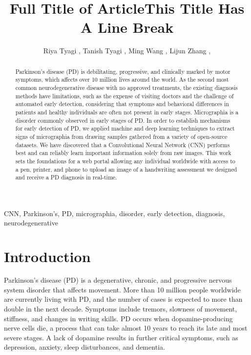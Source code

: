 \documentclass[pmlr,twocolumn,10pt]{jmlr} %
\title[Short Title]{Full Title of Article\titlebreak This Title Has
A Line Break}
\author{Riya Tyagi \nametag{\thanks{Authors contributed equally}\SUP{1}},
Tanish Tyagi \nametag{\footnotemark[1]\SUP{2}}, 
Ming Wang \SUP{3},
Lijun Zhang \SUP{4},
\centering \Email{
\\[\bigskipamount] 
\SUP{1}\{rtyagi\}
@exeter.edu}
\centering \Email{
\\[\bigskipamount] 
\SUP{2}\{ttyagi\}@mgh.harvard.edu}
\centering \Email{
\\[\bigskipamount] 
\SUP{3}\{mwang\}@phs.psu.edu}
\centering \Email{
\\[\bigskipamount] 
\SUP{4}\{lzhang6\}@pennstatehealth.psu.edu}
}
\begin{document}
\maketitle

\begin{abstract}
Parkinson’s disease (PD) is debilitating, progressive, and clinically marked by motor symptoms, which affects over 10 million lives around the world. As the second most common neurodegenerative disease with no approved treatments, the existing diagnosis methods have limitations, such as the expense of visiting doctors and the challenge of automated early detection, considering that symptoms and behavioral differences in patients and healthy individuals are often not present in early stages. Micrographia is a disorder commonly observed in early stages of PD. In order to establish mechanisms for early detection of PD, we applied machine and deep learning techniques to extract signs of micrographia from drawing samples gathered from a variety of open-source datasets. We have discovered that a Convolutional Neural Network (CNN) performs best and can reliably learn important information solely from raw images. This work sets the foundations for a web portal allowing any individual worldwide with access to a pen, printer, and phone to upload an image of a handwriting assessment we designed and receive a PD diagnosis in real-time.
\end{abstract}
\begin{keywords}
CNN, Parkinson’s, PD, micrographia, disorder, early detection, diagnosis, neurodegenerative
\end{keywords}

\section{Introduction}
\label{sec:intro}

Parkinson’s disease (PD) is a degenerative, chronic, and progressive nervous system disorder that affects movement. More than 10 million people worldwide are currently living with PD, and the number of cases is expected to more than double in the next decade. Symptoms include tremors, slowness of movement, stiffness, and changes in writing skills. PD occurs when dopamine-producing nerve cells die, a process that can take almost 10 years to reach its late and most severe stages. A lack of dopamine results in further critical symptoms, such as depression, anxiety, sleep disturbances, and dementia. 
\end{document}
